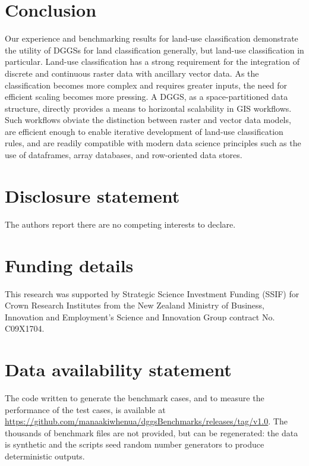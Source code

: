 \documentclass[]{interact}
\theoremstyle{plain}%
\theoremstyle{definition}
\theoremstyle{remark}
\begin{document}
\section{Conclusion}

Our experience and benchmarking results for land-use classification demonstrate the utility of \acp{DGGS} for land classification generally, but land-use classification in particular. Land-use classification has a strong requirement for the integration of discrete and continuous raster data with ancillary vector data. As the classification becomes more complex and requires greater inputs, the need for efficient scaling becomes more pressing. A \ac{DGGS}, as a space-partitioned data structure, directly provides a means to horizontal scalability in \ac{GIS} workflows. Such workflows obviate the distinction between raster and vector data models, are efficient enough to enable iterative development of land-use classification rules, and are readily compatible with modern data science principles such as the use of dataframes, array databases, and row-oriented data stores.

\clearpage

\section*{Disclosure statement}

The authors report there are no competing interests to declare.

\section*{Funding details}

This research was supported by Strategic Science Investment Funding (SSIF) for Crown Research Institutes from the New Zealand Ministry of Business, Innovation and Employment's Science and Innovation Group contract No. C09X1704.

\section*{Data availability statement}
The code written to generate the benchmark cases, and to measure the performance of the test cases, is available at \url{https://github.com/manaakiwhenua/dggsBenchmarks/releases/tag/v1.0}. The thousands of benchmark files are not provided, but can be regenerated: the data is synthetic and the scripts seed random number generators to produce deterministic outputs.
\end{document}
